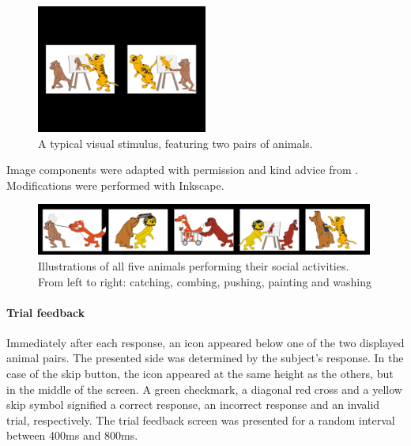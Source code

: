 \begin{figure}[h]
\begin{center}
\vspace{7mm}
\includegraphics[width=0.5\textwidth]{pics/3_1_screen}
\caption{\label{3.1.screen} A typical visual stimulus, featuring two pairs of animals.}
\end{center}
\end{figure}

Image components were adapted with permission and kind advice from \cite{3.1.animals}.
Modifications were performed with Inkscape.

\begin{figure}[h]
\begin{center}
\vspace{7mm}
\includegraphics[width=0.99\textwidth]{pics/3_1_activities}
\caption{\label{3.1.activities} Illustrations of all five animals performing their social activities. From left to right: catching, combing, pushing, painting and washing}
\end{center}
\end{figure}

\paragraph{Trial feedback}
Immediately after each response, an icon appeared below one of the two displayed animal pairs.
The presented side was determined by the subject's response.
In the case of the skip button, the icon appeared at the same height as the others, but in the middle of the screen.
A green checkmark, a diagonal red cross and a yellow skip symbol signified a correct response, an incorrect response and an invalid trial, respectively.
The trial feedback screen was presented for a random interval between 400ms and 800ms.

